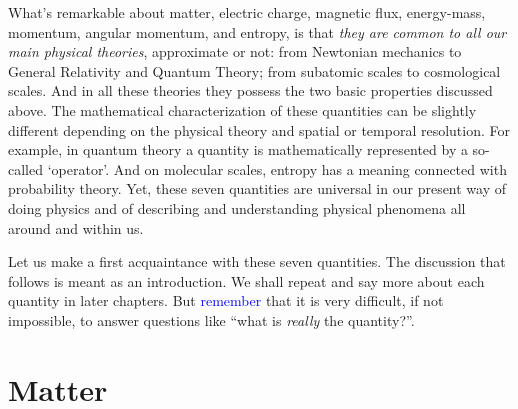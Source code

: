 \documentclass[a4paper,12pt,%
onecolumn,oneside,%
british%
]{memoir}
\providecommand{\href}[2]{#2}
\renewcommand*{\|}[1][]{\nonscript\:#1\vert\nonscript\:\mathopen{}}
\newcommand*{\sect}{\S}%
\newcommand*{\furl}[2]{\href{#1}{#2}\pagenote{\url{#1}}}
\renewcommand*{\autoref}[2]{\sidepar{\vspace{-1ex}\footnotesize{\color{blue}\faIcon{%
angle-right%
}\enskip\sect~\ref{#1} page~\pageref{#1}}}\textcolor{blue}{#2}}
\newcommand*{\energym}{energy-mass}
\begin{document}
\medskip

What's remarkable about matter, electric charge, magnetic flux, \energym, momentum, angular momentum, and entropy, is that \emph{they are common to all our main physical theories}, approximate or not: from Newtonian mechanics to General Relativity and Quantum Theory; from subatomic scales to cosmological scales. And in all these theories they possess the two basic properties discussed above. The mathematical characterization of these quantities can be slightly different depending on the physical theory and spatial or temporal resolution. For example, in quantum theory a quantity is mathematically represented by a so-called \enquote*{operator}. And on molecular scales, entropy has a meaning connected with probability theory. Yet, these seven quantities are universal in our present way of doing physics and of describing and understanding physical phenomena all around and within us.

%
%

Let us make a first acquaintance with these seven quantities. The discussion that follows is meant as an introduction. We shall repeat and say more about each quantity in later chapters.
But \autoref{sec:primitives}{remember} that it is very difficult, if not impossible, to answer questions like \enquote{what is \emph{really} the quantity\textellipsis?}.

\section{Matter}
\label{sec:intro_matter}
\end{document}
